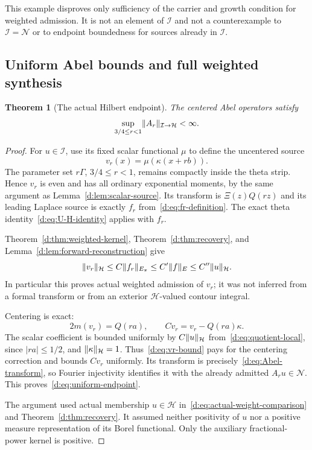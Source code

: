 \documentclass[11pt,a4paper]{article}
\numberwithin{equation}{section}
\newtheorem{theorem}{Theorem}[section]
\theoremstyle{definition}\newtheorem{definition}[theorem]{Definition}
\theoremstyle{remark}\newtheorem{remark}[theorem]{Remark}
\newcommand{\Hh}{\mathcal H}\newcommand{\Hw}{\mathcal H}
\newcommand{\Nn}{\mathcal N}\newcommand{\Ii}{\mathcal I}\newcommand{\Zz}{\mathcal Z}
\begin{document}
This example disproves only sufficiency of the carrier and growth condition for weighted admission. It is not an element of $\Ii$ and not a counterexample to $\Ii=\Nn$ or to endpoint boundedness for sources already in $\Ii$.


\subsection{Uniform Abel bounds and full weighted synthesis}\label{d:sec:criterion}

\begin{theorem}[The actual Hilbert endpoint]\label{d:thm:uniform-endpoint}
The centered Abel operators satisfy
\begin{equation}\label{d:eq:uniform-endpoint}
 \sup_{3/4\le r<1}\norm{A_r}_{\Ii\to\Hh}<\infty.
\end{equation}
\end{theorem}
\begin{proof}
For $u\in\Ii$, use its fixed scalar functional $\mu$ to define the uncentered source
\[
 v_r(x)=\mu(\kappa(x+rb)).
\]
The parameter set $r\Gamma$, $3/4\le r<1$, remains compactly inside the theta strip. Hence $v_r$ is even and has all ordinary exponential moments, by the same argument as Lemma~\ref{d:lem:scalar-source}. Its transform is $\Xi(z)Q(rz)$ and its leading Laplace source is exactly $f_r$ from~\eqref{d:eq:fr-definition}. The exact theta identity~\eqref{d:eq:U-H-identity} applies with $f_r$.

Theorem~\ref{d:thm:weighted-kernel}, Theorem~\ref{d:thm:recovery}, and Lemma~\ref{d:lem:forward-reconstruction} give
\begin{equation}\label{d:eq:vr-bound}
 \norm{v_r}_{\Hh}
 \le C\norm{f_r}_{E_\pi}
 \le C'\norm{f}_E
 \le C''\norm{u}_{\Hh}.
\end{equation}
In particular this proves actual weighted admission of $v_r$; it was not inferred from a formal transform or from an exterior $\Hh$-valued contour integral.

Centering is exact:
\[
 2m(v_r)=Q(ra),\qquad Cv_r=v_r-Q(ra)\kappa.
\]
The scalar coefficient is bounded uniformly by $C\norm{u}_{\Hh}$ from~\eqref{d:eq:quotient-local}, since $|ra|\le1/2$, and $\norm{\kappa}_{\Hh}=1$. Thus~\eqref{d:eq:vr-bound} pays for the centering correction and bounds $Cv_r$ uniformly. Its transform is precisely~\eqref{d:eq:Abel-transform}, so Fourier injectivity identifies it with the already admitted $A_ru\in\Nn$. This proves~\eqref{d:eq:uniform-endpoint}.

The argument used actual membership $u\in\Hh$ in~\eqref{d:eq:actual-weight-comparison} and Theorem~\ref{d:thm:recovery}. It assumed neither positivity of $u$ nor a positive measure representation of its Borel functional. Only the auxiliary fractional-power kernel is positive.
\end{proof}
\end{document}
